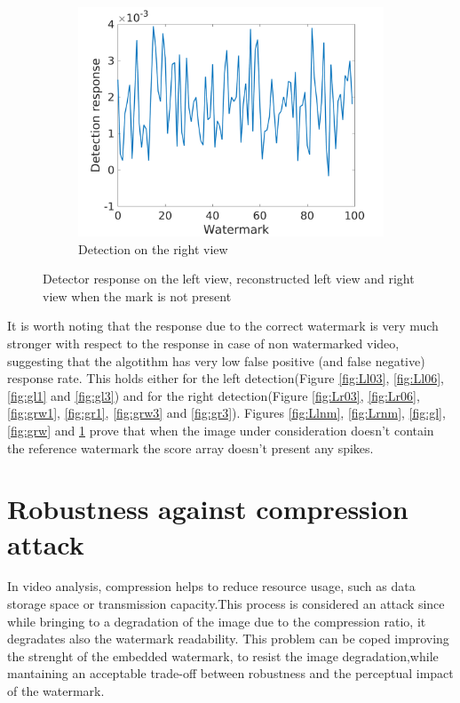 \begin{figure}[h!]
\begin{subfigure}[t]{0.5\textwidth}
\includegraphics[width=1\textwidth]{./img/corr_gauss/right_warped_corr_value_NM.png}
   \caption{\small{Detection on the right view}\label{fig:gr}}
\end{subfigure}
\caption{Detector response on the left view, reconstructed left view and right view when the mark is not present\label{fig:gauss}}
\end{figure}


It is worth noting that the response due to the correct watermark is very much stronger with respect to the response in case of non watermarked video, suggesting that the algotithm has very low false positive (and false negative) response rate. This holds either for the left detection(Figure \ref{fig:Ll03}, \ref{fig:Ll06}, \ref{fig:gl1} and \ref{fig:gl3}) and for the right detection(Figure \ref{fig:Lr03}, \ref{fig:Lr06}, \ref{fig:grw1}, \ref{fig:gr1}, \ref{fig:grw3} and \ref{fig:gr3}). Figures \ref{fig:Llnm},  \ref{fig:Lrnm}, \ref{fig:gl}, \ref{fig:grw} and \ref{fig:gr} prove that when the image under consideration doesn't contain the reference watermark the score array doesn't present any spikes.
\clearpage
\section{Robustness against compression attack}

In video analysis, compression helps to reduce resource usage, such as data storage space or transmission capacity.\newline This process is considered an attack since while bringing to a degradation of the image due to the compression ratio, it degradates also the watermark readability.\newline 
This problem can be coped improving the strenght of the embedded watermark, to resist the image degradation,while mantaining an acceptable trade-off between robustness and the perceptual impact of the watermark. \newline


